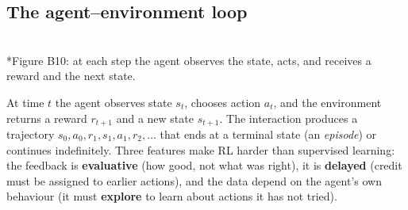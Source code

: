 \documentclass[11pt]{article}
\begin{document}
\subsection{The agent--environment loop}
\begin{center}\\*{\small\color{GreyN}Figure B10: at each step the agent observes the state, acts, and receives a reward and the next state.}\end{center}
At time $t$ the agent observes state $s_t$, chooses action $a_t$, and the environment returns a reward $r_{t+1}$ and a new state $s_{t+1}$. The interaction produces a trajectory $s_0,a_0,r_1,s_1,a_1,r_2,\ldots$ that ends at a terminal state (an \emph{episode}) or continues indefinitely. Three features make RL harder than supervised learning: the feedback is \textbf{evaluative} (how good, not what was right), it is \textbf{delayed} (credit must be assigned to earlier actions), and the data depend on the agent's own behaviour (it must \textbf{explore} to learn about actions it has not tried).
\end{document}
